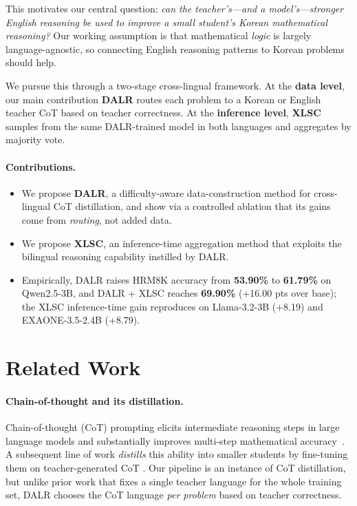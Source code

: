 \documentclass{article}
\begin{document}
This motivates our central question: \emph{can the teacher's---and a
model's---stronger English reasoning be used to improve a small
student's Korean mathematical reasoning?} Our working assumption is
that mathematical \emph{logic} is largely language-agnostic, so
connecting English reasoning patterns to Korean problems should help.

We pursue this through a two-stage cross-lingual framework. At the
\textbf{data level}, our main contribution \textbf{DALR} routes each
problem to a Korean or English teacher CoT based on teacher
correctness. At the \textbf{inference level}, \textbf{XLSC} samples
from the same DALR-trained model in both languages and aggregates by
majority vote.

\paragraph{Contributions.}
\begin{itemize}
  \item We propose \textbf{DALR}, a difficulty-aware data-construction
  method for cross-lingual CoT distillation, and show via a controlled
  ablation that its gains come from \emph{routing}, not added data.
  \item We propose \textbf{XLSC}, an inference-time aggregation method
  that exploits the bilingual reasoning capability instilled by DALR.
  \item Empirically, DALR raises HRM8K accuracy from \textbf{53.90\%}
  to \textbf{61.79\%} on Qwen2.5-3B, and DALR + XLSC reaches
  \textbf{69.90\%} (+16.00 pts over base); the XLSC inference-time
  gain reproduces on Llama-3.2-3B (+8.19) and EXAONE-3.5-2.4B (+8.79).
\end{itemize}

\section{Related Work}
\paragraph{Chain-of-thought and its distillation.}
Chain-of-thought (CoT) prompting elicits intermediate reasoning steps
in large language models and substantially improves multi-step
mathematical accuracy~\citep{wei2022cot}. A subsequent line of work
\emph{distills} this ability into smaller students by fine-tuning
them on teacher-generated CoT
\citep{magister2023teaching, ho2023large, hsieh2023distilling}.
Our pipeline is an instance of CoT distillation, but unlike prior
work that fixes a single teacher language for the whole training set,
DALR chooses the CoT language \emph{per problem} based on teacher
correctness.
\end{document}
